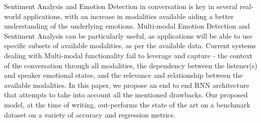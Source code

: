 Sentiment Analysis and Emotion Detection in conversation is key in several real-world applications, with an increase in modalities available aiding a better understanding of the underlying emotions. Multi-modal Emotion Detection and Sentiment Analysis can be particularly useful, as applications will be able to use specific subsets of available modalities, as per the available data. Current systems dealing with Multi-modal functionality fail to leverage and capture - the context of the conversation through all modalities, the dependency between the listener(s) and speaker emotional states, and the relevance and relationship between the available modalities. In this paper, we propose an end to end RNN architecture that attempts to take into account all the mentioned drawbacks. Our proposed model, at the time of writing, out-performs the state of the art on a benchmark dataset on a variety of accuracy and regression metrics.
